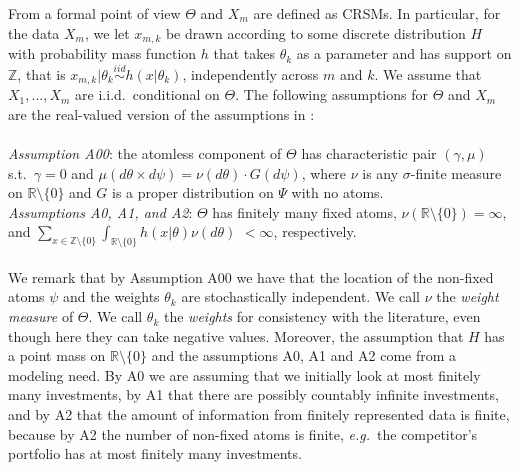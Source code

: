 \documentclass{article}
\theoremstyle{plain}
\theoremstyle{remark}
\begin{document}
From a formal point of view $\Theta$ and $X_{m}$ are defined as CRSMs. In particular, for the data $X_{m}$, we let $x_{m,k}$ be drawn according to some discrete distribution $H$ with probability mass function $h$ that takes $\theta_{k}$ as a parameter and has support on $\mathbb{Z}$, that is $x_{m,k}|\theta_k\stackrel{iid}{\sim}h(x|\theta_{k})$, independently across $m$ and $k$. We assume that $X_{1},...,X_{m}$ are i.i.d.~conditional on $\Theta$. The following assumptions for $\Theta$ and $X_{m}$ are the real-valued version of the assumptions in \citet{Bro1}:
\\\\ \textit{Assumption A00}: the atomless component of $\Theta$ has characteristic pair $(\gamma,\mu)$ s.t.~$\gamma=0$ and $\mu(d\theta\times d\psi)=\nu(d\theta)\cdot G(d\psi)$, where $\nu$ is any $\sigma$-finite measure on $\mathbb{R}\setminus\{0\}$ and $G$ is a proper distribution on $\Psi$ with no atoms. 
\\ \textit{Assumptions A0, A1, and A2}: $\Theta$ has finitely many fixed atoms, $\nu(\mathbb{R}\setminus\{0\})=\infty$, and $\sum_{x\in\mathbb{Z}\setminus\{0\}}\int_{\mathbb{R}\setminus\{0\}}h(x|\theta)\nu(d\theta)$ $<\infty$, respectively.
\\\\
We remark that by Assumption A00 we have that the location of the non-fixed atoms $\psi$ and the weights $\theta_{k}$ are stochastically independent. We call $\nu$ the \textit{weight measure} of $\Theta$. We call $\theta_{k}$ the \textit{weights} for consistency with the literature, even though here they can take negative values. Moreover, the assumption that $H$ has a point mass on $\mathbb{R}\setminus\{0\}$ and the assumptions A0, A1 and A2 come from a modeling need. By A0 we are assuming that we initially look at most finitely many investments, by A1 that there are possibly countably infinite investments, and by A2 that the amount of information from finitely represented data is finite, because by A2 the number of non-fixed atoms is finite, \textit{e.g.}~the competitor's portfolio has at most finitely many investments.
\end{document}
